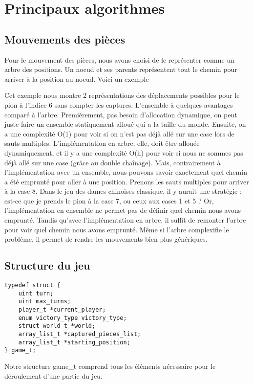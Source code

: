 \section{Principaux algorithmes}
\subsection{Mouvements des pièces}
Pour le mouvement des pièces, nous avons choisi de le représenter comme
un arbre des positions. Un noeud et ses parents représentent tout le 
chemin pour arriver à la position au noeud. Voici un exemple



Cet exemple nous montre 2 représentations des déplacements possibles pour
le pion à l'indice 6 sans compter les captures. L'ensemble à quelques avantages comparé à l'arbre.
Premièrement, pas besoin d'allocation dynamique, on peut juste faire un ensemble statiquement alloué
qui a la taille du monde. Ensuite, on a une complexité O(1) pour voir si on n'est pas déjà allé sur une case
lors de sauts multiples. L'implémentation en arbre, elle, doit être allouée dynamiquement,
et il y a une complexité O(h) pour voir si nous ne sommes pas déjà allé sur une case (grâce au double chaînage).
Mais, contrairement à l'implémentation avec un ensemble, nous pouvons savoir
exactement quel chemin a été emprunté pour aller à une position. Prenons les sauts
multiples pour arriver à la case 8. Dans le jeu des dames chinoises classique,
il y aurait une stratégie : est-ce que je prends le pion à la case 7, ou ceux aux cases 1 et 5 ?
Or, l'implémentation en ensemble ne permet pas de définir quel chemin nous avons emprunté.
Tandis qu'avec l'implémentation en arbre, il suffit de remonter l'arbre pour voir quel chemin nous avons emprunté.
Même si l'arbre complexifie le problème, il permet de rendre les mouvements bien plus génériques.


\subsection{Structure du jeu}

\begin{verbatim}
typedef struct {
    uint turn;
    uint max_turns;
    player_t *current_player;
    enum victory_type victory_type;
    struct world_t *world;
    array_list_t *captured_pieces_list;
    array_list_t *starting_position;
} game_t;
\end{verbatim}


Notre structure game\_t comprend tous les éléments nécessaire pour le déroulement d'une partie du jeu.

